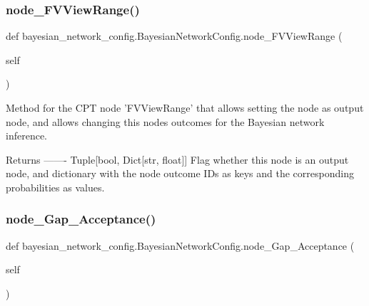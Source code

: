 \subsubsection{\texorpdfstring{node\+\_\+\+F\+V\+View\+Range()}{node\_FVViewRange()}\hspace{0.1cm}{\footnotesize\ttfamily [3/3]}}
{\footnotesize\ttfamily def bayesian\+\_\+network\+\_\+config.\+Bayesian\+Network\+Config.\+node\+\_\+\+F\+V\+View\+Range (\begin{DoxyParamCaption}\item[{}]{self }\end{DoxyParamCaption})}

\begin{DoxyVerb}Method for the CPT node 'FVViewRange' that allows setting the node as output node, 
and allows changing this nodes outcomes for the Bayesian network inference.

Returns
-------
Tuple[bool, Dict[str, float]]
    Flag whether this node is an output node, and dictionary with the node outcome IDs as keys 
    and the corresponding probabilities as values.
\end{DoxyVerb}
 \mbox{\label{classbayesian__network__config_1_1_bayesian_network_config_a86c960e95351259be8f751f98ac91aa5}} 
\subsubsection{\texorpdfstring{node\+\_\+\+Gap\+\_\+\+Acceptance()}{node\_Gap\_Acceptance()}\hspace{0.1cm}{\footnotesize\ttfamily [1/2]}}
{\footnotesize\ttfamily def bayesian\+\_\+network\+\_\+config.\+Bayesian\+Network\+Config.\+node\+\_\+\+Gap\+\_\+\+Acceptance (\begin{DoxyParamCaption}\item[{}]{self }\end{DoxyParamCaption})}

